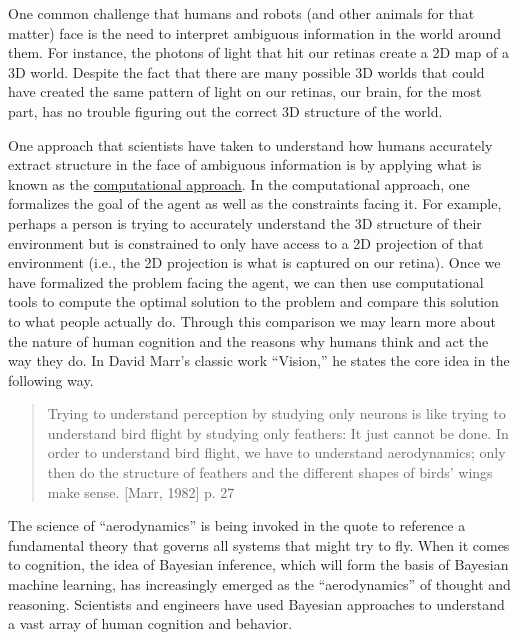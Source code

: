 \documentclass[assignment01_Solutions]{subfiles}
\begin{document}
One common challenge that humans and robots (and other animals for that matter) face is the need to interpret ambiguous information in the world around them.  For instance, the photons of light that hit our retinas create a 2D map of a 3D world.  Despite the fact that there are many possible 3D worlds that could have created the same pattern of light on our retinas, our brain, for the most part, has no trouble figuring out the correct 3D structure of the world.

One approach that scientists have taken to understand how humans accurately extract structure in the face of ambiguous information is by applying what is known as the \href{https://www.cse.huji.ac.il/~yweiss/intro/node2.html}{computational approach}.  In the computational approach, one formalizes the goal of the agent as well as the constraints facing it.  For example, perhaps a person is trying to accurately understand the 3D structure of their environment but is constrained to only have access to a 2D projection of that environment (i.e., the 2D projection is what is captured on our retina).  Once we have formalized the problem facing the agent, we can then use computational tools to compute the optimal solution to the problem and compare this solution to what people actually do.  Through this comparison we may learn more about the nature of human cognition and the reasons why humans think and act the way they do.  In David Marr's classic work ``Vision,'' he states the core idea in the following way.

\begin{quote}
Trying to understand perception by studying only neurons is like trying to understand bird flight by studying only feathers: It just cannot be done. In order to understand bird flight, we have to understand aerodynamics; only then do the structure of feathers and the different shapes of birds' wings make sense. [Marr, 1982] p. 27
 \end{quote}

The science of ``aerodynamics'' is being invoked in the quote to reference a fundamental theory that governs all systems that might try to fly.  When it comes to cognition, the idea of Bayesian inference, which will form the basis of Bayesian machine learning, has increasingly emerged as the ``aerodynamics'' of thought and reasoning.  Scientists and engineers have used Bayesian approaches to understand a vast array of human cognition and behavior.
\end{document}
